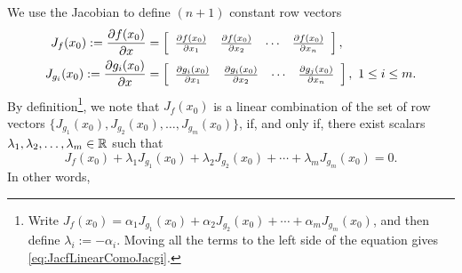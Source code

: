 We use the Jacobian to define $(n+1)$ constant row vectors
\begin{equation}
    \begin{aligned}
        J_f(x_0) := \frac{\partial f(x_0)}{\partial x} &= \left[ \begin{array}{cccc} \frac{\partial f(x_0) }{\partial x_1}& \frac{\partial f(x_0)}{\partial x_2}  & \cdots & \frac{\partial f(x_0)}{\partial x_n}\end{array} \right],  \medskip \\
        J_{g_i}(x_0):= \frac{\partial g_i(x_0)}{\partial x} &=  \left[ \begin{array}{cccc} \frac{\partial g_i(x_0) }{\partial x_1}& \frac{\partial g_i(x_0)}{\partial x_2}  & \cdots & \frac{\partial g_j(x_0)}{\partial x_n}\end{array} \right], ~1 \le i \le m.
    \end{aligned}
\end{equation}
By definition\footnote{Write $J_f(x_0) = \alpha_1 J_{g_1}(x_0) + \alpha_2 J_{g_2}(x_0) + \cdots + \alpha_m J_{g_m}(x_0)$, and then define $\lambda_i:= - \alpha_i$. Moving all the terms to the left side of the equation gives \eqref{eq:JacfLinearComoJacgi}.}, we note that $J_f(x_0)$ is a linear combination of the set of row vectors $\{ J_{g_1}(x_0), J_{g_2}(x_0), \ldots, J_{g_m}(x_0) \}$, if, and only if, there exist scalars $\lambda_1, \lambda_2, \ldots, \lambda_m \in \mathbb R$ such that
\begin{equation}
\label{eq:JacfLinearComoJacgi}
    J_f(x_0) + \lambda_1 J_{g_1}(x_0) + \lambda_2 J_{g_2}(x_0) + \cdots + \lambda_m J_{g_m}(x_0) =0.
\end{equation}
In other words, 
